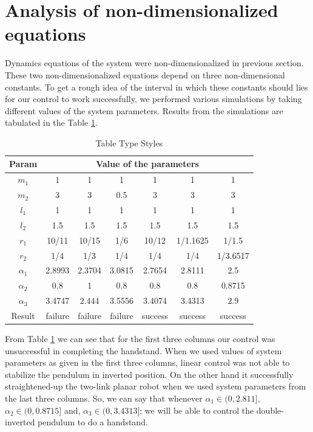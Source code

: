 \documentclass[conference]{IEEEtran}
\begin{document}
\section{Analysis of non-dimensionalized equations}
Dynamics equations of the system were non-dimensionalized in previous section. These two non-dimensionalized equations depend on three non-dimensional constants. To get a rough idea of the interval in which these constants should lies for our control to work successfully, we performed various simulations by taking different values of the system parameters. Results from the simulations are tabulated in the Table \ref{tab1}.

\begin{table}[htbp]
    \caption{Table Type Styles}
    \begin{center}
        \begin{tabular}{|c|c|c|c|c|c|c|}
            \hline
            \textbf{Param}&\multicolumn{6}{|c|}{\textbf{Value of the parameters}} \\
            \hline
            $m_1$& 1& 1& 1& 1& 1& 1 \\
            \hline
            $m_2$& 3& 3& 0.5& 3& 3& 3 \\
            \hline
            $l_1$& 1& 1& 1& 1& 1& 1 \\
            \hline
            $l_2$& 1.5& 1.5& 1.5& 1.5& 1.5& 1.5 \\
            \hline
            $r_1$& 10/11& 10/15& 1/6& 10/12& 1/1.1625& 1/1.5 \\
            \hline
            $r_2$& 1/4& 1/3& 1/4& 1/4& 1/4& 1/3.6517 \\
            \hline
            $\alpha_1$& 2.8993& 2.3704& 3.0815& 2.7654& 2.8111& 2.5 \\
            \hline
            $\alpha_2$& 0.8& 1& 0.8& 0.8& 0.8& 0.8715 \\
            \hline
            $\alpha_3$& 3.4747& 2.444& 3.5556& 3.4074& 3.4313& 2.9 \\
            \hline
            Result& failure& failure& failure& success& success& success \\
            \hline
        \end{tabular}
        \label{tab1}
    \end{center}
\end{table}
From Table \ref{tab1} we can see that for the first three columns our control was unsuccessful in completing the handstand. When we used values of system parameters as given in the first three columns, linear control was not able to stabilize the pendulum in inverted position. On the other hand it successfully straightened-up the two-link planar robot when we used system parameters from the last three columns. So, we can say that whenever $\alpha_1 \in (0, 2.811]$, $\alpha_2 \in (0, 0.8715]$ and, $\alpha_3 \in (0, 3.4313]$; we will be able to control the double-inverted pendulum to do a handstand.
\end{document}
